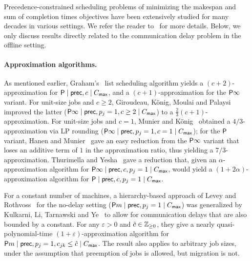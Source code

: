 Precedence-constrained scheduling problems of minimizing the makespan and sum of completion times objectives have been extensively studied  for many decades in various settings. We refer the reader to~\cite{michael2018scheduling,lawler1993sequencing,PruhsST04,ambuhl2008precedence,svensson2009approximability} for more details.
Below, we only discuss results directly related  to the communication delay problem in the offline setting.


\paragraph{Approximation algorithms.}
As mentioned earlier,  Graham's~\cite{GrahamListScheduling1966} list scheduling algorithm
yields a $(c+2)$-approximation
for
$\mathsf{P} \mid \mathsf{prec}, c \mid C_{\mathsf{max}}$,
and a $(c+1)$-approximation for the $\mathsf{P} \infty$ variant.
For unit-size jobs and $c \ge 2$,
Giroudeau, K\"onig, Moulai and Palaysi~\cite{GiroudeauKMP08}
improved the latter
($\mathsf{P} \infty \mid \mathsf{prec}, p_j=1, c \ge 2 \mid C_{\mathsf{max}}$)
to a $\frac{2}{3}(c+1)$-approximation.
For unit-size jobs and $c = 1$,
Munier and K\"onig~\cite{MunierKonig}
obtained a $4/3$-approximation
via LP rounding %
($\mathsf{P} \infty \mid \mathsf{prec}, p_j=1, c=1 \mid C_{\mathsf{max}}$);
for the $\mathsf{P}$ variant,
Hanen and Munier~\cite{HanenMunier73Apx}
gave an easy reduction from the $\mathsf{P} \infty$ variant
that loses an additive term of $1$ in the approximation ratio,
thus yielding a $7/3$-approximation.
Thurimella and Yesha~\cite{ThurimellaYesha}
gave a reduction that,
given an $\alpha$-approximation algorithm for $\mathsf{P} \infty \mid \mathsf{prec}, c, p_j=1 \mid C_{\mathsf{max}}$,
would yield a $(1 + 2 \alpha)$-approximation algorithm for $\mathsf{P} \mid \mathsf{prec}, c, p_j=1 \mid C_{\mathsf{max}}$.


For a constant number of machines,
a hierarchy-based approach of Levey and Rothvoss~\cite{LeveyR16} for the no-delay setting
($\mathsf{P} m \mid \mathsf{prec}, p_j=1 \mid C_{\mathsf{max}}$)
was 
generalized by Kulkarni, Li, Tarnawski and Ye~\cite{KulkarniLTY20}
to allow for communication delays that are also bounded by a constant.
For any $\varepsilon > 0$ and $\hat c \in \mathbb{Z}_{\ge 0}$,
they give a nearly quasi-polynomial-time $(1+\varepsilon)$-approximation algorithm
for $\mathsf{P} m \mid \mathsf{prec}, p_j=1, c_{jk} \le \hat c \mid C_{\mathsf{max}}$.
The result also applies to arbitrary job sizes, under the assumption that preemption of jobs is allowed, but migration is not.

